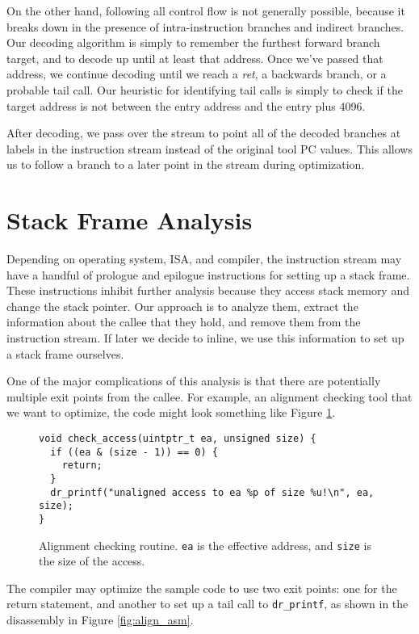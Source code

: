 On the other hand, following all control flow is not generally possible, because
it breaks down in the presence of intra-instruction branches and indirect
branches.  Our decoding algorithm is simply to remember the furthest forward
branch target, and to decode up until at least that address.  Once we've passed
that address, we continue decoding until we reach a {\em ret}, a backwards
branch, or a probable tail call.  Our heuristic for identifying tail calls is
simply to check if the target address is not between the entry address and the
entry plus 4096.

After decoding, we pass over the stream to point all of the decoded branches at
labels in the instruction stream instead of the original tool PC values.  This
allows us to follow a branch to a later point in the stream during optimization.

\section{Stack Frame Analysis}

Depending on operating system, ISA, and compiler, the instruction stream may
have a handful of prologue and epilogue instructions for setting up a stack
frame.  These instructions inhibit further analysis because they access stack
memory and change the stack pointer.  Our approach is to analyze them, extract
the information about the callee that they hold, and remove them from the
instruction stream.  If later we decide to inline, we use this information to
set up a stack frame ourselves.

One of the major complications of this analysis is that there are potentially
multiple exit points from the callee.  For example, an alignment checking tool
that we want to optimize, the code might look something like Figure
\ref{fig:align_code}.

\begin{figure}
\begin{verbatim}
void check_access(uintptr_t ea, unsigned size) {
  if ((ea & (size - 1)) == 0) {
    return;
  }
  dr_printf("unaligned access to ea %p of size %u!\n", ea, size);
}
\end{verbatim}
\caption{Alignment checking routine.  {\tt ea} is the effective address, and
{\tt size} is the size of the access.}
\label{fig:align_code}
\end{figure}

The compiler may optimize the sample code to use two exit points: one for the
return statement, and another to set up a tail call to {\tt dr\_printf}, as
shown in the disassembly in Figure \ref{fig:align_asm}.

